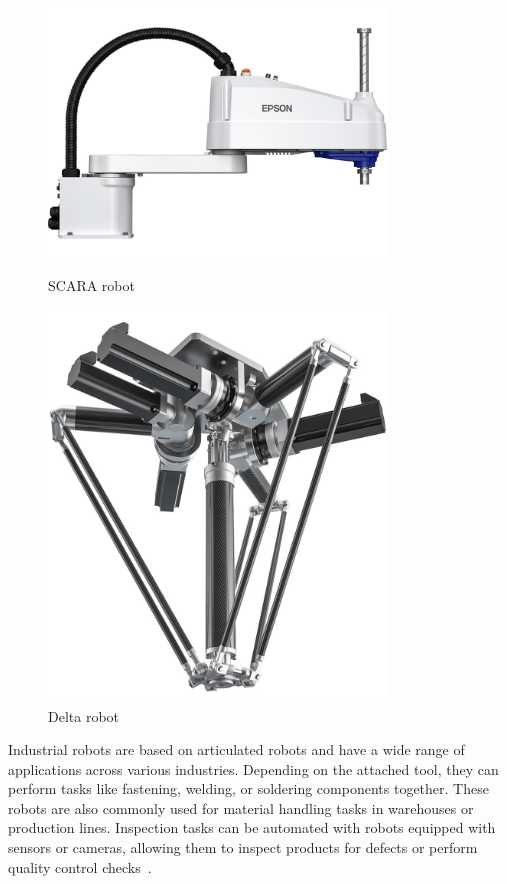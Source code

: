 \begin{figure}[H]	
	\centering
	\begin{minipage}{0.5\textwidth}
		\includegraphics[width=0.8\textwidth]{figures/scara.png}
		\caption{SCARA robot}
		\label{Scara}
	\end{minipage}\hfill
	\begin{minipage}{0.5\textwidth}
		\includegraphics[width=0.8\textwidth]{figures/delta.png}
		\caption{Delta robot}
		\label{Delta}
	\end{minipage}\par
\end{figure}



Industrial robots are based on articulated robots and have a wide range of applications across various industries. Depending on the attached tool, they can perform tasks like fastening, welding, or soldering components together. These robots are also commonly used for material handling tasks in warehouses or production lines. Inspection tasks can be automated with robots equipped with sensors or cameras, allowing them to inspect products for defects or perform quality control checks~\cite{Hagele.2016}.


